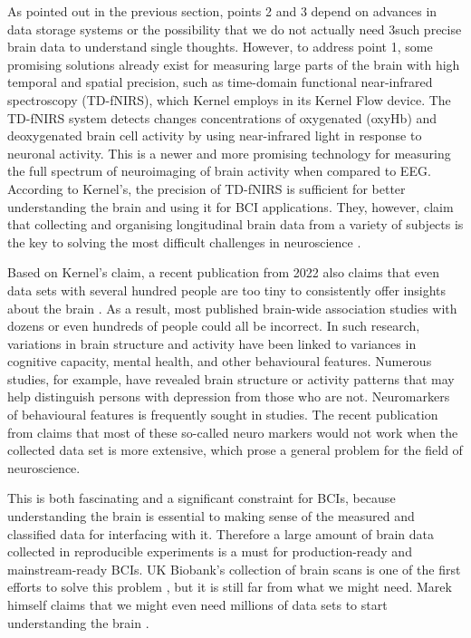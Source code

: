 As pointed out in the previous section, points 2 and 3 depend on advances in data storage systems or the possibility that we do not actually need 3such precise brain data to understand single thoughts. However, to address point 1, some promising solutions already exist for measuring large parts of the brain with high temporal and spatial precision, such as time-domain functional near-infrared spectroscopy (TD-fNIRS), which Kernel employs in its Kernel Flow device. The TD-fNIRS system detects changes concentrations of oxygenated (oxyHb) and deoxygenated brain cell activity by using near-infrared light in response to neuronal activity. This is a newer and more promising technology for measuring the full spectrum of neuroimaging of brain activity when compared to EEG. According to Kernel's, the precision of TD-fNIRS is sufficient for better understanding the brain and using it for BCI applications. They, however, claim that collecting and organising longitudinal brain data from a variety of subjects is the key to solving the most difficult challenges in neuroscience \citep{kernel_hello-humanitypdf_nodate}.

Based on Kernel's claim, a recent publication from 2022 also claims that even data sets with several hundred people are too tiny to consistently offer insights about the brain \citep{marek_reproducible_2022}. As a result, most published brain-wide association studies with dozens or even hundreds of people could all be incorrect. In such research, variations in brain structure and activity have been linked to variances in cognitive capacity, mental health, and other behavioural features. Numerous studies, for example, have revealed brain structure or activity patterns that may help distinguish persons with depression from those who are not. Neuromarkers of behavioural features is frequently sought in studies. The recent publication from \citeauthor{marek_reproducible_2022} claims that most of these so-called neuro markers would not work when the collected data set is more extensive, which prose a general problem for the field of neuroscience.

This is both fascinating and a significant constraint for BCIs, because understanding the brain is essential to making sense of the measured and classified data for interfacing with it. Therefore a large amount of brain data collected in reproducible experiments is a must for production-ready and mainstream-ready BCIs. UK Biobank's collection of brain scans is one of the first efforts to solve this problem \citep{noauthor_imaging_nodate}, but it is still far from what we might need. Marek himself claims that we might even need millions of data sets to start understanding the brain \citep{callaway_can_2022}.

